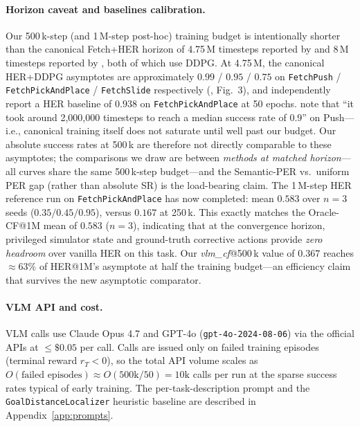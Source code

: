 \documentclass{article}
\begin{document}
\paragraph{Horizon caveat and baselines calibration.}
Our 500\,k-step (and 1\,M-step post-hoc) training budget is intentionally
shorter than the canonical Fetch+HER horizon of 4.75\,M timesteps reported
by \citet{plappert2018multigoal} and 8\,M timesteps reported by
\citet{andrychowicz2017her}, both of which use DDPG. At 4.75\,M, the
canonical HER+DDPG asymptotes are approximately $0.99$ / $0.95$ / $0.75$ on
\texttt{FetchPush} / \texttt{FetchPickAndPlace} / \texttt{FetchSlide}
respectively (\citealp{plappert2018multigoal}, Fig.\ 3), and
\citet{zhao2018energy} independently report a HER baseline of $0.938$ on
\texttt{FetchPickAndPlace} at 50 epochs. \citet{plappert2018multigoal} note
that ``it took around 2{,}000{,}000 timesteps to reach a median success
rate of $0.9$'' on Push---i.e., canonical training itself does not saturate
until well past our budget. Our absolute success rates at 500\,k are
therefore not directly comparable to these asymptotes; the comparisons we
draw are between \emph{methods at matched horizon}---all curves share the
same 500\,k-step budget---and the Semantic-PER vs.\ uniform PER gap (rather
than absolute SR) is the load-bearing claim. The 1\,M-step HER reference
run on \texttt{FetchPickAndPlace} has now completed: mean
$0.583$ over $n\!=\!3$ seeds ($0.35 / 0.45 / 0.95$), versus $0.167$ at
250\,k. This exactly matches the Oracle-CF@1M mean of $0.583$
($n\!=\!3$), indicating that at the convergence horizon, privileged
simulator state and ground-truth corrective actions provide
\emph{zero headroom} over vanilla HER on this task. Our
\emph{vlm\_cf}@500\,k value of $0.367$ reaches $\approx\!63\%$ of
HER@1M's asymptote at half the training budget---an efficiency claim
that survives the new asymptotic comparator.

\paragraph{VLM API and cost.}
VLM calls use Claude Opus 4.7 and GPT-4o (\texttt{gpt-4o-2024-08-06}) via
the official APIs at $\le\!\$0.05$ per call. Calls are issued only on failed
training episodes (terminal reward $r_T\!<\!0$), so the total API volume scales
as $O(\text{failed episodes}) \approx O(500\text{k}/50) = 10\text{k}$ calls per
run at the sparse success rates typical of early training. The per-task-description
prompt and the \texttt{GoalDistanceLocalizer} heuristic baseline are described
in Appendix~\ref{app:prompts}.
\end{document}
